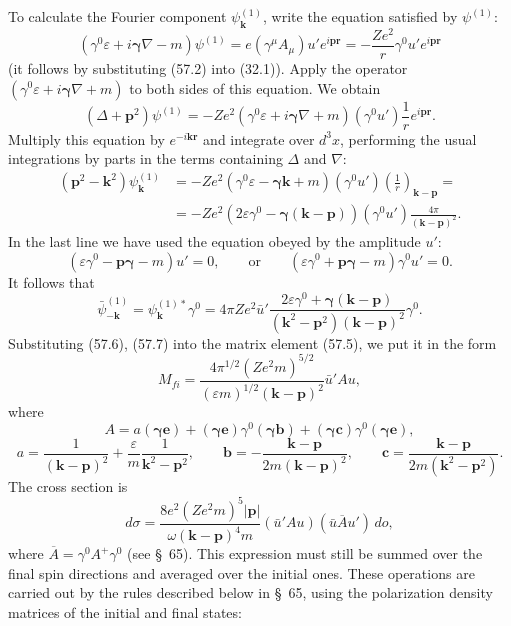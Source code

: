 To calculate the Fourier component $\psi_{\mathbf k}^{(1)}$, write the equation satisfied by $\psi^{(1)}$:
\[
(\gamma^0\varepsilon+i\boldsymbol\gamma\nabla-m)\psi^{(1)}
=e(\gamma^\mu A_\mu)u'e^{i\mathbf p\mathbf r}
=-\frac{Ze^2}r\gamma^0u'e^{i\mathbf p\mathbf r}
\]
(it follows by substituting (57.2) into (32.1)). Apply the operator $(\gamma^0\varepsilon+i\boldsymbol\gamma\nabla+m)$ to both sides of this equation. We obtain
\[
(\Delta+\mathbf p^2)\psi^{(1)}
=-Ze^2(\gamma^0\varepsilon+i\boldsymbol\gamma\nabla+m)
(\gamma^0u')\frac1r e^{i\mathbf p\mathbf r}.
\]
Multiply this equation by $e^{-i\mathbf k\mathbf r}$ and integrate over $d^3x$, performing the usual integrations by parts in the terms containing $\Delta$ and $\nabla$:
\[
\begin{aligned}
(\mathbf p^2-\mathbf k^2)\psi_{\mathbf k}^{(1)}
&=-Ze^2(\gamma^0\varepsilon-\boldsymbol\gamma\mathbf k+m)
(\gamma^0u')\left(\frac1r\right)_{\mathbf k-\mathbf p}={}\\
&=-Ze^2(2\varepsilon\gamma^0-\boldsymbol\gamma(\mathbf k-\mathbf p))
(\gamma^0u')\frac{4\pi}{(\mathbf k-\mathbf p)^2}.
\end{aligned}
\]
In the last line we have used the equation obeyed by the amplitude $u'$:
\[
(\varepsilon\gamma^0-\mathbf p\boldsymbol\gamma-m)u'=0,
\qquad\text{or}\qquad
(\varepsilon\gamma^0+\mathbf p\boldsymbol\gamma-m)\gamma^0u'=0.
\]
It follows that
\begin{equation}
\bar\psi_{-\mathbf k}^{(1)}
=\psi_{\mathbf k}^{(1)*}\gamma^0
=4\pi Ze^2\bar u'
\frac{2\varepsilon\gamma^0+\boldsymbol\gamma(\mathbf k-\mathbf p)}
{(\mathbf k^2-\mathbf p^2)(\mathbf k-\mathbf p)^2}\gamma^0.
\tag{57.7}
\end{equation}
Substituting (57.6), (57.7) into the matrix element (57.5), we put it in the form
\[
M_{fi}=\frac{4\pi^{1/2}(Ze^2m)^{5/2}}
{(\varepsilon m)^{1/2}(\mathbf k-\mathbf p)^2}\bar u'Au,
\]
where
\[
A=a(\boldsymbol\gamma\mathbf e)
+(\boldsymbol\gamma\mathbf e)\gamma^0(\boldsymbol\gamma\mathbf b)
+(\boldsymbol\gamma\mathbf c)\gamma^0(\boldsymbol\gamma\mathbf e),
\]
\[
a=\frac1{(\mathbf k-\mathbf p)^2}
+\frac\varepsilon m\frac1{\mathbf k^2-\mathbf p^2},
\qquad
\mathbf b=-\frac{\mathbf k-\mathbf p}{2m(\mathbf k-\mathbf p)^2},
\qquad
\mathbf c=\frac{\mathbf k-\mathbf p}{2m(\mathbf k^2-\mathbf p^2)}.
\]
The cross section is
\[
d\sigma=\frac{8e^2(Ze^2m)^5|\mathbf p|}
{\omega(\mathbf k-\mathbf p)^4m}
(\bar u'Au)(\bar u\overline A u')\,do,
\]
where $\overline A=\gamma^0A^+\gamma^0$ (see \S~65). This expression must still be summed over the final spin directions and averaged over the initial ones. These operations are carried out by the rules described below in \S~65, using the polarization density matrices of the initial and final states:
